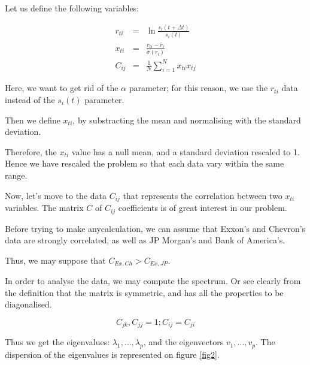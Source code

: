 \documentclass[a4paper]{tufte-book}
\newcommand{\nth}{\frac{1}{N}}
\newcommand{\sumin}{\sum_{i=1}^N}
\begin{document}
Let us define the following variables:

\begin{eqnarray}
    r_{ti} & = &  \ln \frac{s_i(t+\Delta t)}{s_i(t)}\\
    x_{ti} & = & \frac{r_{ti} - \bar{r}_i}{\sigma(r_i)}\\
    C_{ij} & = & \nth \sumin x_{ti} x_{tj} 
\end{eqnarray}

Here, we want to get rid of the $\alpha$ parameter; for this reason, we use the
$r_{ti}$ data instead of the $s_i(t)$ parameter.

Then we define $x_{ti}$, by substracting the mean and normalising with the
standard deviation.

Therefore, the $x_{ti}$ value has a null mean, and a standard deviation rescaled
to 1. Hence we have rescaled the problem so that each data vary within the same
range.

Now, let's move to the data $C_{ij}$ that represents the correlation between two
$x_{ti}$ variables. The matrix $C$ of $C_{ij}$ coefficients is of great interest
in our problem.


Before trying to make anycalculation, we can assume that Exxon's and Chevron's
data are strongly correlated, as well as JP Morgan's and Bank of America's.

Thus, we may suppose that $C_{Ex,Ch} > C_{Ex,JP}$.

In order to analyse the data, we may compute the spectrum. 
Or see clearly from the definition that the matrix is symmetric, and has all the
properties to be diagonalised.

\begin{equation}
    C_{jk}, C_{jj} = 1 ; C_{ij} = C_{ji}
\end{equation}

Thus we get the eigenvalues: $\lambda_1, … , \lambda_p$, and the eigenvectors
$v_1, … , v_p$. The dispersion of the eigenvalues is represented on figure
\ref{fig2}.
\end{document}
